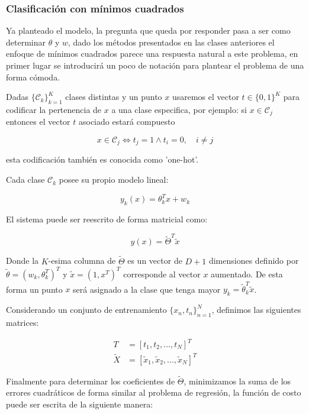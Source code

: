 \subsubsection{Clasificación con mínimos cuadrados}

Ya planteado el modelo, la pregunta que queda por responder pasa a ser como determinar $\theta$ y $w$, dado los métodos presentados en las clases anteriores el enfoque de mínimos cuadrados parece una respuesta natural a este problema, en primer lugar se introducirá un poco de notación para plantear el problema de una forma cómoda.

Dadas $\{\mathcal{C}_k\}_{k=1}^K$ clases distintas y un punto $x$ usaremos el vector $t\in\{0,1\}^K$ para codificar la pertenencia de $x$ a una clase especifica, por ejemplo: si $x\in\mathcal{C}_j$ entonces el vector $t$ asociado estará compuesto 

\begin{equation}
    x\in\mathcal{C}_j \Leftrightarrow t_j=1 \wedge t_i=0, \quad i\neq j
\end{equation}

esta codificación también es conocida como 'one-hot'.

Cada clase $\mathcal{C}_k$ posee su propio modelo lineal:

\begin{equation}
    y_k(x) = \theta_k^Tx + w_k \nonumber
\end{equation}

El sistema puede ser reescrito de forma matricial como:

\begin{equation}
    y(x) = \tilde{\Theta}^T\tilde{x}
\end{equation}

Donde la $K$-esima columna de $\tilde{\Theta}$ es un vector de $D+1$ dimensiones definido por $\tilde{\theta}=(w_k, \theta_k^T)^T$ y $\tilde{x}=(1,x^T)^T$ corresponde al vector $x$ aumentado. De esta forma un punto $x$ será asignado a la clase que tenga mayor $y_k=\tilde{\theta}_k^T\tilde{x}$.

Considerando un conjunto de entrenamiento $\{x_n,t_n\}_{n=1}^N$, definimos las siguientes matrices:

\begin{align}
    T &= [t_1, t_2,\ldots, t_N]^T\\
    \tilde{X} &= [\tilde{x}_1, \tilde{x}_2, \ldots, \tilde{x}_N ]^T
\end{align}

Finalmente para determinar los coeficientes de $\tilde{\Theta}$, minimizamos la suma de los errores cuadráticos de forma similar al problema de regresión, la función de costo puede ser escrita de la siguiente manera:

